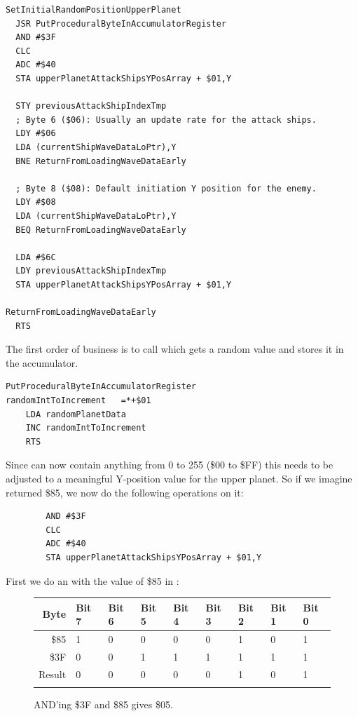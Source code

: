 \begin{lstlisting}[caption=The sub-routine \icode{SetInitialRandomPositionUpperPlanet} in \icode{GetWaveDateForNewShip}.  ]
SetInitialRandomPositionUpperPlanet   
  JSR PutProceduralByteInAccumulatorRegister
  AND #$3F
  CLC
  ADC #$40
  STA upperPlanetAttackShipsYPosArray + $01,Y

  STY previousAttackShipIndexTmp
  ; Byte 6 ($06): Usually an update rate for the attack ships.
  LDY #$06
  LDA (currentShipWaveDataLoPtr),Y
  BNE ReturnFromLoadingWaveDataEarly

  ; Byte 8 ($08): Default initiation Y position for the enemy. 
  LDY #$08
  LDA (currentShipWaveDataLoPtr),Y
  BEQ ReturnFromLoadingWaveDataEarly

  LDA #$6C
  LDY previousAttackShipIndexTmp
  STA upperPlanetAttackShipsYPosArray + $01,Y

ReturnFromLoadingWaveDataEarly   
  RTS
\end{lstlisting}

The first order of business is to call  which gets a random value and stores it in the accumulator.

\begin{lstlisting}
PutProceduralByteInAccumulatorRegister
randomIntToIncrement   =*+$01
    LDA randomPlanetData
    INC randomIntToIncrement
    RTS
\end{lstlisting}

Since  can now contain anything from 0 to 255 (\$00 to \$FF) this needs to be adjusted to a meaningful Y-position
value for the upper planet. So if we imagine  returned \$85, we now do the
following operations on it:

\begin{lstlisting}
        AND #$3F
        CLC
        ADC #$40
        STA upperPlanetAttackShipsYPosArray + $01,Y
\end{lstlisting}

First we do an  with the value of \$85 in :
\begin{figure}[H]
  {
    \setlength{\tabcolsep}{3.0pt}
    \setlength\cmidrulewidth{\heavyrulewidth} %
    \begin{adjustbox}{width=10cm,center}

      \begin{tabular}{rllllllll}
        \toprule
        Byte & Bit 7 & Bit 6 & Bit 5 & Bit 4 & Bit 3 & Bit 2 & Bit 1 & Bit 0        \\
        \midrule
        \$85 & 1 & 0 & 0 & 0 & 0 & 1 & 0 & 1 \\
        \$3F & 0 & 0 & 1 & 1 & 1 & 1 & 1 & 1 \\
        \midrule
        Result & 0 & 0 & 0 & 0 & 0 & 1 & 0 & 1 \\
        \addlinespace
        \bottomrule
      \end{tabular}

    \end{adjustbox}

    }\caption*{AND'ing \$3F and \$85 gives \$05.}
\end{figure}

